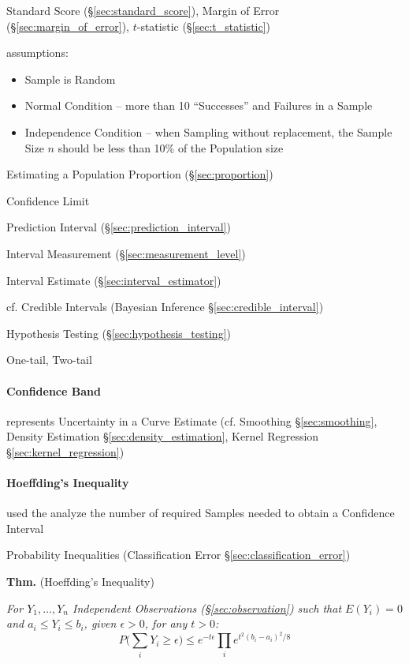 \fist Standard Score (\S\ref{sec:standard_score}), Margin of Error
(\S\ref{sec:margin_of_error}), $t$-statistic (\S\ref{sec:t_statistic})

assumptions:
\begin{itemize}
  \item Sample is Random
  \item Normal Condition -- more than 10 ``Successes'' and Failures in a Sample
  \item Independence Condition -- when Sampling without replacement, the Sample
    Size $n$ should be less than 10\% of the Population size
\end{itemize}

Estimating a Population Proportion (\S\ref{sec:proportion})

Confidence Limit

Prediction Interval (\S\ref{sec:prediction_interval})

Interval Measurement (\S\ref{sec:measurement_level})

Interval Estimate (\S\ref{sec:interval_estimator})

cf. Credible Intervals (Bayesian Inference \S\ref{sec:credible_interval})

Hypothesis Testing (\S\ref{sec:hypothesis_testing})

One-tail, Two-tail



\paragraph{Confidence Band}\label{sec:confidence_band}\hfill

represents Uncertainty in a Curve Estimate (cf. Smoothing \S\ref{sec:smoothing},
Density Estimation \S\ref{sec:density_estimation}, Kernel Regression
\S\ref{sec:kernel_regression})



\paragraph{Hoeffding's Inequality}\label{sec:hoeffdings_inequality}\hfill

used the analyze the number of required Samples needed to obtain a Confidence
Interval

\fist Probability Inequalities (Classification Error
\S\ref{sec:classification_error})

\textbf{Thm.} (Hoeffding's Inequality)

\emph{
  For $Y_1, \ldots, Y_n$ Independent Observations (\S\ref{sec:observation}) such
  that $E(Y_i) = 0$ and $a_i \leq Y_i \leq b_i$, given $\epsilon > 0$, for any
  $t > 0$:
  \[
    P\Big(\sum_i Y_i \geq \epsilon\Big) \leq
      e^{-t\epsilon} \prod_i e^{t^2(b_i - a_i)^2/8}
  \]
}



